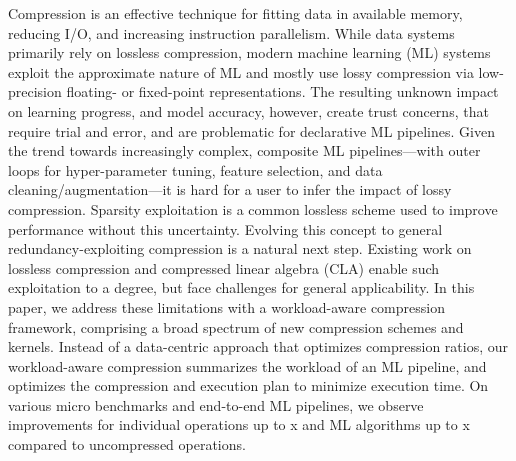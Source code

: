 

Compression is an effective technique for fitting data in available memory, reducing I/O, and increasing instruction parallelism. While data systems primarily rely on lossless compression, modern machine learning (ML) systems exploit the approximate nature of ML and mostly use lossy compression via low-precision floating- or fixed-point representations. The resulting unknown impact on learning progress, and model accuracy, however, create trust concerns, that require trial and error, and are problematic for declarative ML pipelines.
Given the trend towards increasingly complex, composite ML pipelines---with outer loops for hyper-parameter tuning, feature selection, and data cleaning/augmentation---it is hard for a user to infer the impact of lossy compression. Sparsity exploitation is a common lossless scheme used to improve performance without this uncertainty. Evolving this concept to general redundancy-exploiting compression is a natural next step. Existing work on lossless compression and compressed linear algebra (CLA) enable such exploitation to a degree, but face challenges for general applicability.
In this paper, we address these limitations with a workload-aware compression framework, comprising a broad spectrum of new compression schemes and kernels. Instead of a data-centric approach that optimizes compression ratios, our workload-aware compression summarizes the workload of an ML pipeline, and optimizes the compression and execution plan to minimize execution time.
On various micro benchmarks and end-to-end ML pipelines, we observe improvements for individual operations up to x and ML algorithms up to x compared to uncompressed operations.
